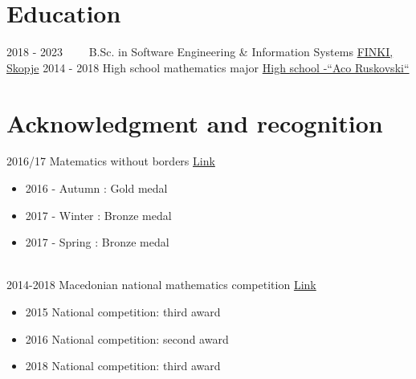 \documentclass[letterpaper]{twentysecondcv} %
\begin{document}

\section{Education}

\begin{twenty} %
	\twentyitem
    	{2018 - 2023~~~~}
        {}
        {B.Sc. in Software Engineering \& Information Systems}
        {\href{https://www.finki.ukim.mk/en}{FINKI, Skopje}}
        {}
        {}
	\twentyitem
    	{2014 - 2018}
		{}
        {High school mathematics major}
        {\href{https://acoruskovski.edu.mk/}{High school -“Aco Ruskovski“}}
        {}
        {}
\end{twenty}

\newpage

\makesidebarSecond %


\section{Acknowledgment and recognition}
\begin{twenty} %
	\twentyitem
    		{2016/17}
		{}
        		{Matematics without borders}
        		{\href{https://mathwithoutborders.bg/public_html/en/}{Link}}
        		{}
        		{\begin{itemize}
        			\item 2016 - Autumn : Gold medal
                    \item 2017 - Winter : Bronze medal
                    \item 2017 - Spring : Bronze medal
        		\end{itemize}}\\
        	\twentyitem
    		{2014-2018}
		{}
        		{Macedonian national mathematics competition}
        		{\href{https://smm.org.mk/en/}{Link}}
        		{}
        		{\begin{itemize}
        			\item 2015 National competition: third award
                    \item 2016 National competition: second award
                    \item 2018 National competition: third award
        		\end{itemize}}
\end{twenty}
\end{document}
